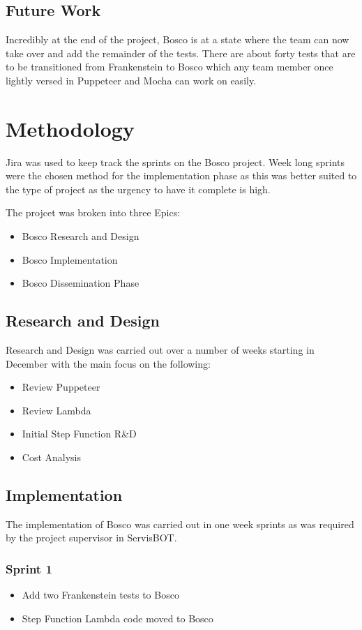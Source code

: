 \documentclass[12pt,a4paper,titlepage]{report}
\begin{document}
\section{Future Work}
Incredibly at the end of the project, Bosco is at a state where the team can now take over and add the remainder of the tests. There are about forty tests that are to be transitioned from Frankenstein to Bosco which any team member 
once lightly versed in Puppeteer and Mocha can work on easily. 

\appendix
\chapter{Methodology}
Jira was used to keep track the sprints on the Bosco project. Week long sprints were the chosen method for the implementation phase as this
was better suited to the type of project as the urgency to have it complete is high.

The projcet was broken into three Epics:

\begin{itemize}
  \item Bosco Research and Design
  \item Bosco Implementation
  \item Bosco Dissemination Phase
\end{itemize}
\section{Research and Design}
Research and Design was carried out over a number of weeks starting in December with the main focus on the following:
\begin{itemize}
\item Review Puppeteer
\item Review Lambda
\item Initial Step Function R\&D
\item Cost Analysis
\end{itemize}

\section{Implementation}
The implementation of Bosco was carried out in one week sprints as was required by the project supervisor in ServisBOT\@. 
\subsection*{Sprint 1}
\begin{itemize}
\item Add two Frankenstein tests to Bosco
\item Step Function Lambda code moved to Bosco
\end{itemize}
\end{document}
